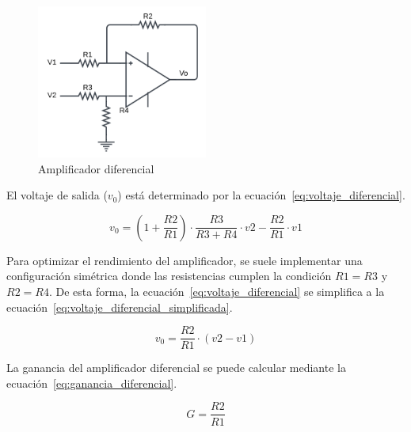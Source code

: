             \begin{figure}[H]
                \centering
                \includegraphics[width=0.5\textwidth]{img/Desarrollo/Amplificador_Diferencial.png}
                \caption[Amplificador diferencial]{Amplificador diferencial\footnotemark}
                \label{fig:Amplificador_Diferencial}
            \end{figure}

            El voltaje de salida ($v_0$) está determinado por la ecuación~\ref{eq:voltaje_diferencial}.

            \begin{equation}
                \label{eq:voltaje_diferencial}
                v_0 = (1 + \frac{R2}{R1}) \cdot \frac{R3}{R3 + R4} \cdot v2 - \frac{R2}{R1} \cdot v1
            \end{equation}

            Para optimizar el rendimiento del amplificador, se suele implementar una configuración simétrica donde las resistencias cumplen la condición $R1 = R3$ y $R2 = R4$. De esta forma, la ecuación~\ref{eq:voltaje_diferencial} se simplifica a la ecuación~\ref{eq:voltaje_diferencial_simplificada}.

            \begin{equation}
                \label{eq:voltaje_diferencial_simplificada}
                v_0 = \frac{R2}{R1} \cdot (v2 - v1)
            \end{equation}

            La ganancia del amplificador diferencial se puede calcular mediante la ecuación~\ref{eq:ganancia_diferencial}.

            \begin{equation}
                \label{eq:ganancia_diferencial}
                G = \frac{R2}{R1}
            \end{equation}

